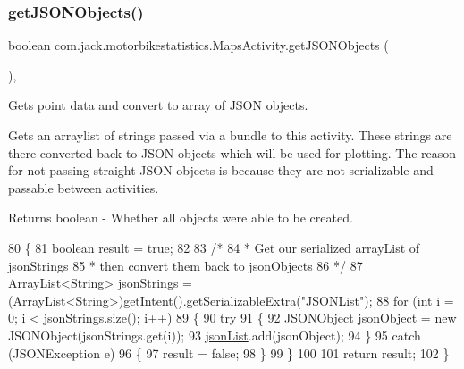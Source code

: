 \subsubsection{\texorpdfstring{get\+J\+S\+O\+N\+Objects()}{getJSONObjects()}}
{\footnotesize\ttfamily boolean com.\+jack.\+motorbikestatistics.\+Maps\+Activity.\+get\+J\+S\+O\+N\+Objects (\begin{DoxyParamCaption}{ }\end{DoxyParamCaption})\hspace{0.3cm}{\ttfamily [inline]}, {\ttfamily [private]}}



Gets point data and convert to array of J\+S\+ON objects. 

Gets an arraylist of strings passed via a bundle to this activity. These strings are there converted back to J\+S\+ON objects which will be used for plotting. The reason for not passing straight J\+S\+ON objects is because they are not serializable and passable between activities.

\begin{DoxyReturn}{Returns}
boolean -\/ Whether all objects were able to be created. 
\end{DoxyReturn}

\begin{DoxyCode}
80     \{
81         \textcolor{keywordtype}{boolean} result = \textcolor{keyword}{true};
82 
83         \textcolor{comment}{/*}
84 \textcolor{comment}{         * Get our serialized arrayList of jsonStrings}
85 \textcolor{comment}{         * then convert them back to jsonObjects}
86 \textcolor{comment}{         */}
87         ArrayList<String> jsonStrings = (ArrayList<String>)getIntent().getSerializableExtra(\textcolor{stringliteral}{"JSONList"});
88         \textcolor{keywordflow}{for} (\textcolor{keywordtype}{int} i = 0; i < jsonStrings.size(); i++)
89         \{
90             \textcolor{keywordflow}{try}
91             \{
92                 JSONObject jsonObject = \textcolor{keyword}{new} JSONObject(jsonStrings.get(i));
93                 \hyperlink{classcom_1_1jack_1_1motorbikestatistics_1_1_maps_activity_aaed26c36e08dad942830ab52d9d75d2e}{jsonList}.add(jsonObject);
94             \}
95             \textcolor{keywordflow}{catch} (JSONException e)
96             \{
97                 result = \textcolor{keyword}{false};
98             \}
99         \}
100 
101         \textcolor{keywordflow}{return} result;
102     \}
\end{DoxyCode}
\mbox{\label{classcom_1_1jack_1_1motorbikestatistics_1_1_maps_activity_ae5478e56dfb617433d0dfaeb94a403c7}} 

